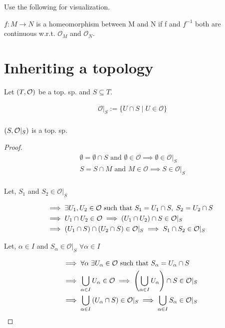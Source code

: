 Use the following for visualization.

$ f: M \longrightarrow N$ is a homeomorphism between M and N if f and $ f^{-1}$ both are continuous w.r.t. $ \mathcal{O}_M$ and $ \mathcal{O}_N$.

\section{Inheriting a topology}

Let $ \left(  T, \mathcal{O} \right)$ be a top. sp. and $ S \subseteq T$.

\begin{align*}
    & \mathcal{O}|_S := \{ U \cap S \mid U \in \mathcal{O} \} \\
\end{align*}

$ \left(  S, \mathcal{O}|_S \right)$ is a top. sp.

\begin{proof}
    \begin{align*}
        & \emptyset = \emptyset \cap S \text{ and } \emptyset \in \mathcal{O} \implies \emptyset \in \mathcal{O}|_S \\
        & S = S \cap M \text{ and } M \in \mathcal{O} \implies S \in \mathcal{O}|_S \\
    \end{align*}

    Let, $ S_1$ and $ S_2 \in \mathcal{O}|_S$

    \begin{align*}
        & \implies \exists U_1, U_2 \in \mathcal{O} \text{ such that } S_1 = U_1 \cap S, \; S_2 = U_2 \cap S \\
        & \implies U_1 \cap U_2 \in \mathcal{O} \implies \left(  U_1 \cap U_2 \right) \cap S \in \mathcal{O}|_S \\
        & \implies \left(  U_1 \cap S \right) \cap \left(  U_2 \cap S \right) \in \mathcal{O}|_S \implies S_1 \cap S_2 \in \mathcal{O}|_S \\
    \end{align*}

    Let, $ \alpha \in I$ and $ S_\alpha \in \mathcal{O}|_S$ $ \forall \alpha \in I$

    \begin{align*}
        & \implies \forall \alpha \; \exists U_\alpha \in \mathcal{O} \text{ such that } S_\alpha = U_\alpha \cap S \\
        & \implies \bigcup_{\alpha \in I} U_\alpha \in \mathcal{O} \implies \left(  \bigcup_{\alpha \in I} U_\alpha \right) \cap S \in \mathcal{O}|_S \\
        & \implies \bigcup_{\alpha \in I} \left(  U_\alpha \cap S \right) \in \mathcal{O}|_S \implies \bigcup_{\alpha \in I} S_\alpha \in \mathcal{O}|_S \\
    \end{align*}
\end{proof}

